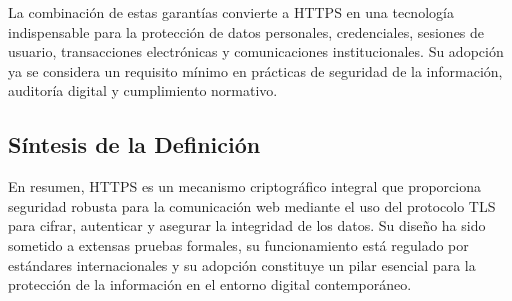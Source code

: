 La combinación de estas garantías convierte a HTTPS en una tecnología indispensable para la protección de datos personales, credenciales, sesiones de usuario, transacciones electrónicas y comunicaciones institucionales. Su adopción ya se considera un requisito mínimo en prácticas de seguridad de la información, auditoría digital y cumplimiento normativo.

\subsection{Síntesis de la Definición}

En resumen, HTTPS es un mecanismo criptográfico integral que proporciona seguridad robusta para la comunicación web mediante el uso del protocolo TLS para cifrar, autenticar y asegurar la integridad de los datos. Su diseño ha sido sometido a extensas pruebas formales, su funcionamiento está regulado por estándares internacionales y su adopción constituye un pilar esencial para la protección de la información en el entorno digital contemporáneo.
